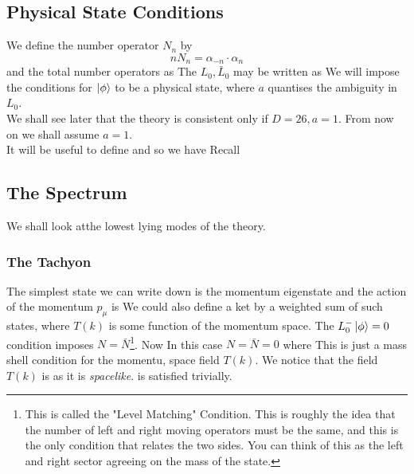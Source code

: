 \documentclass{article}
\begin{document}
\subsection{Physical State Conditions}
We define the number operator $N_n$ by 
\[
n N_n = \alpha_{-n} \cdot \alpha_n
\]
and the total number operators as 
The $L_0, \bar{L}_0$ may be written as 
We will impose the conditions 
for $\ket{\phi}$ to be a physical state, where $a$ quantises the ambiguity in $L_0$. \\
We shall see later that the theory is consistent only if $D=26, a=1$. From now on we shall assume $a=1$. \\
It will be useful to define  
and so we have
Recall 

\subsection{The Spectrum}
We shall look atthe lowest lying modes of the theory. 

\subsubsection*{The Tachyon}
The simplest state we can write down is the momentum eigenstate 
and the action of the momentum $p_\mu$ is 
We could also define a ket by a weighted sum of such states, 
where $T(k)$ is some function of the momentum space. The $L_0^-\ket{\phi} = 0$ condition imposes $N=\bar{N}$\footnote{This is called the "Level Matching" Condition. This is roughly the idea that the number of left and right moving operators must be the same, and this is the only condition that relates the two sides. You can think of this as the left and right sector agreeing on the mass of the state.}. Now 
In this case $N=\bar{N} = 0$
where 
This is just a mass shell condition for the momentu, space field $T(k)$. We notice that the field $T(k)$ is  as it is \emph{spacelike}. 
is satisfied trivially. 
\end{document}
